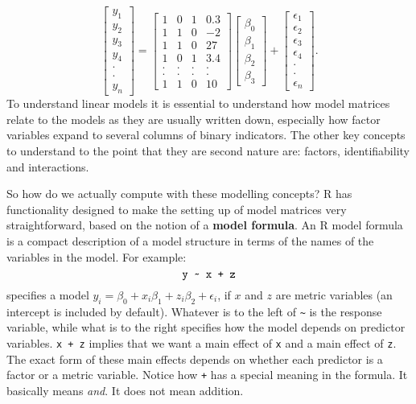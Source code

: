 \documentclass[10pt] {article}
\newcommand{\bmat}[1]{\left [ \begin{array}{#1}}
\newcommand{\emat}{\end{array}\right ]}
\theoremstyle{definition}
\begin{document}
$$
\bmat{c} y_1 \\ y_2 \\ y_3 \\ y_4 \\ \cdot \\ \cdot \\ y_n \emat = 
\bmat{cccc}
1 & 0 &  1 & 0.3 \\
1 & 1 &  0 & -2 \\
1 & 1 &  0 & 27 \\
1 & 0 &  1 & 3.4 \\
. & . & . & . \\. & . & . & . \\
1 & 1 & 0  & 10
\emat \bmat{c} \beta_0 \\ \beta_1 \\ \beta_2 \\ \beta_3 \emat + 
\bmat{c} \epsilon_1 \\ \epsilon_2 \\ \epsilon_3 \\ \epsilon_4 \\ \cdot \\ \cdot \\ \epsilon_n \emat.
$$
To understand linear models it is essential to understand how model matrices relate to the models as they are usually written down, especially how factor variables expand to several columns of binary indicators. The other key concepts to understand to the point that they are second nature are: factors, identifiability and interactions. 

So how do we actually compute with these modelling concepts? R has functionality designed to make the setting up of model matrices very straightforward, based on the notion of a {\bf model formula}.  An R model formula is a compact description of a model structure in terms of the names of the variables in the model. For example:
$$
\verb^y ~ x + z^
$$
specifies a model $y_i = \beta_0 + x_i\beta_1 + z_i \beta_2 + \epsilon_i$, if $x$ and $z$ are metric variables (an intercept is included by default). Whatever is to the left of \verb+~+ is the response variable, while what is to the right specifies how the model depends on predictor variables. \verb^x + z^ implies that we want a main effect of {\tt x} and a main effect of {\tt z}. The exact form of these main effects depends on whether each predictor is a factor or a metric variable. Notice how \verb-+- has a special meaning in the formula. It basically means {\em and}. It does not mean addition. 
\end{document}
